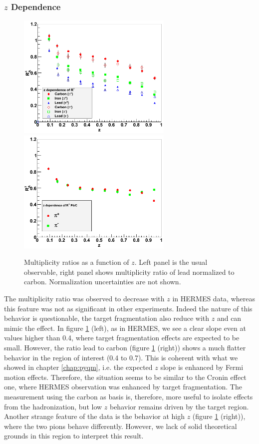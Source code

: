 \subsubsection{$z$ Dependence}

\begin{figure}[tbp]
\centering
\includegraphics[width=7.4cm] {chap6-fig/F_RvZ.png} 
\includegraphics[width=7.4cm] {chap6-fig/F_RvZ_PbC.png} 
\caption {Multiplicity ratios as a function of $z$. Left panel is the usual
observable, right panel shows multiplicity ratio of lead normalized to carbon. 
Normalization uncertainties are not shown.}
\label{fig:Rz}
\end{figure}

The multiplicity ratio was observed to decrease with $z$ in HERMES data, 
whereas this feature was not as significant in other experiments. Indeed the 
nature of this behavior is questionable, the target fragmentation also reduce 
with $z$ and can mimic the effect. In figure \ref{fig:Rz} (left), as in 
HERMES, we see a clear slope even at values higher than 0.4, where target fragmentation
effects are expected to be small. However, the ratio lead to carbon (figure 
\ref{fig:Rz} (right)) shows a much flatter behavior in the region of interest 
(0.4 to 0.7). This is coherent with what we showed in chapter \ref{chap:pyqm}, i.e. the expected $z$ slope 
is enhanced by Fermi motion effects. Therefore, the situation seems to be 
similar to the Cronin effect one, where HERMES observation was enhanced by 
target fragmentation. The measurement using the carbon as basis is, therefore, 
more useful to isolate effects from the hadronization, but low $z$ behavior 
remains driven by the target region. Another strange feature of the data is 
the behavior at high $z$ (figure \ref{fig:Rz} (right)), where the two pions 
behave differently. However, we lack of solid theoretical grounds in this 
region to interpret this result.

